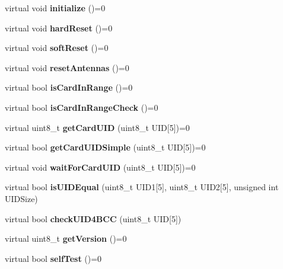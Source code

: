 \begin{DoxyCompactItemize}
\item 
\mbox{\label{classrfid_a76f857b77fbea6776048aab6ba835a29}} 
virtual void {\bfseries initialize} ()=0
\item 
\mbox{\label{classrfid_a7f993197e5aa12e7b3bfb1576552bbf1}} 
virtual void {\bfseries hard\+Reset} ()=0
\item 
\mbox{\label{classrfid_a880add72f6db49af0b1d23878308d733}} 
virtual void {\bfseries soft\+Reset} ()=0
\item 
\mbox{\label{classrfid_abf4826e77ab7b02f04c8f01d969149c1}} 
virtual void {\bfseries reset\+Antennas} ()=0
\item 
\mbox{\label{classrfid_a23fc4ec0bc3790c5e68269d4f32771b9}} 
virtual bool {\bfseries is\+Card\+In\+Range} ()=0
\item 
\mbox{\label{classrfid_a9790d273f2385c8fb48bb85ca2aa0d10}} 
virtual bool {\bfseries is\+Card\+In\+Range\+Check} ()=0
\item 
\mbox{\label{classrfid_afeb2a321694ceaf84db793f5efb3a750}} 
virtual uint8\+\_\+t {\bfseries get\+Card\+U\+ID} (uint8\+\_\+t U\+ID\mbox{[}5\mbox{]})=0
\item 
\mbox{\label{classrfid_aaeb826495120d8d29683f0ea1b985d77}} 
virtual bool {\bfseries get\+Card\+U\+I\+D\+Simple} (uint8\+\_\+t U\+ID\mbox{[}5\mbox{]})=0
\item 
\mbox{\label{classrfid_a1b324cb1e7b4c377eca4b3495d4189fd}} 
virtual void {\bfseries wait\+For\+Card\+U\+ID} (uint8\+\_\+t U\+ID\mbox{[}5\mbox{]})=0
\item 
\mbox{\label{classrfid_a8c239b8e42f20d4310c44368bd5030a7}} 
virtual bool {\bfseries is\+U\+I\+D\+Equal} (uint8\+\_\+t U\+I\+D1\mbox{[}5\mbox{]}, uint8\+\_\+t U\+I\+D2\mbox{[}5\mbox{]}, unsigned int U\+I\+D\+Size)
\item 
\mbox{\label{classrfid_add22fd6bae25ed7baa9ce6d9a61d2053}} 
virtual bool {\bfseries check\+U\+I\+D4\+B\+CC} (uint8\+\_\+t U\+ID\mbox{[}5\mbox{]})
\item 
\mbox{\label{classrfid_a27619628e718bb781f912aead770079a}} 
virtual uint8\+\_\+t {\bfseries get\+Version} ()=0
\item 
\mbox{\label{classrfid_a93e5430380a14fd652e7ca1ce6443198}} 
virtual bool {\bfseries self\+Test} ()=0
\end{DoxyCompactItemize}
